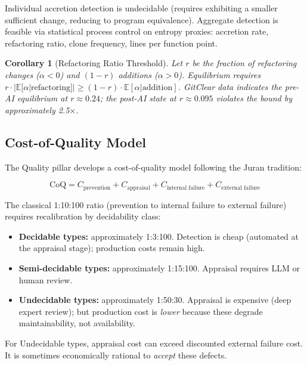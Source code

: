 \documentclass[11pt, a4paper, logo, copyright]{googledeepmind}
\newtheorem{corollary}{Corollary}[section]
\begin{document}
Individual accretion detection is undecidable (requires exhibiting a smaller sufficient change, reducing to program equivalence). Aggregate detection is feasible via statistical process control on entropy proxies: accretion rate, refactoring ratio, clone frequency, lines per function point.

\begin{corollary}[Refactoring Ratio Threshold]
\label{cor:refactoring}
Let $r$ be the fraction of refactoring changes ($\alpha < 0$) and $(1-r)$ additions ($\alpha > 0$). Equilibrium requires $r \cdot |\mathbb{E}[\alpha | \text{refactoring}]| \geq (1-r) \cdot \mathbb{E}[\alpha | \text{addition}]$. GitClear data indicates the pre-AI equilibrium at $r \approx 0.24$; the post-AI state at $r \approx 0.095$ violates the bound by approximately 2.5$\times$.
\end{corollary}

\subsection{Cost-of-Quality Model}

The Quality pillar develops a cost-of-quality model following the Juran tradition:

\begin{equation}
    \text{CoQ} = C_{\text{prevention}} + C_{\text{appraisal}} + C_{\text{internal failure}} + C_{\text{external failure}}
\end{equation}

The classical 1:10:100 ratio (prevention to internal failure to external failure) requires recalibration by decidability class:

\begin{itemize}
\item \textbf{Decidable types:} approximately 1:3:100. Detection is cheap (automated at the appraisal stage); production costs remain high.
\item \textbf{Semi-decidable types:} approximately 1:15:100. Appraisal requires LLM or human review.
\item \textbf{Undecidable types:} approximately 1:50:30. Appraisal is expensive (deep expert review); but production cost is \emph{lower} because these degrade maintainability, not availability.
\end{itemize}

For Undecidable types, appraisal cost can exceed discounted external failure cost. It is sometimes economically rational to \emph{accept} these defects.
\end{document}
